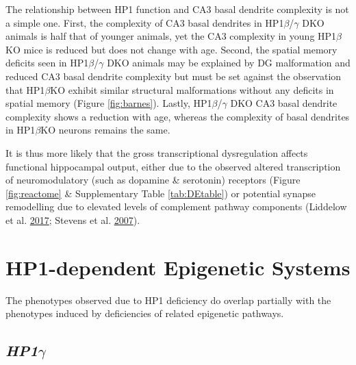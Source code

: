 \documentclass[onehalf,12pt]{beavtex}
\begin{document}
  The relationship between HP1 function and CA3 basal dendrite complexity
  is not a simple one. First, the complexity of CA3 basal dendrites in
  HP1\(\beta\)/\(\gamma\) DKO animals is half that of younger animals, yet
  the CA3 complexity in young HP1\(\beta\)KO mice is reduced but does not
  change with age. Second, the spatial memory deficits seen in
  HP1\(\beta\)/\(\gamma\) DKO animals may be explained by DG malformation
  and reduced CA3 basal dendrite complexity but must be set against the
  observation that HP1\(\beta\)KO exhibit similar structural malformations
  without any deficits in spatial memory (Figure \ref{fig:barnes}).
  Lastly, HP1\(\beta\)/\(\gamma\) DKO CA3 basal dendrite complexity shows
  a reduction with age, whereas the complexity of basal dendrites in
  HP1\(\beta\)KO neurons remains the same.
  
  It is thus more likely that the gross transcriptional dysregulation
  affects functional hippocampal output, either due to the observed
  altered transcription of neuromodulatory (such as dopamine \& serotonin)
  receptors (Figure \ref{fig:reactome} \& Supplementary Table
  \ref{tab:DEtable}) or potential synapse remodelling due to elevated
  levels of complement pathway components (Liddelow et al.
  \protect\hyperlink{ref-LiddelowNeurotoxicreactiveastrocytes2017}{2017};
  Stevens et al.
  \protect\hyperlink{ref-StevensClassicalComplementCascade2007}{2007}).
  
  \section{HP1-dependent Epigenetic
  Systems}\label{hp1-dependent-epigenetic-systems}
  
  The phenotypes observed due to HP1 deficiency do overlap partially with
  the phenotypes induced by deficiencies of related epigenetic pathways.
  
  \subsection*{\texorpdfstring{\emph{HP1\(\gamma\)}}{HP1\textbackslash{}gamma}}\label{hp1gamma}
  
\end{document}
